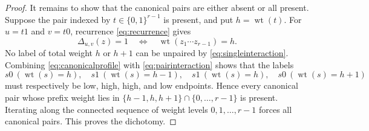 \documentclass[11pt]{article}
\theoremstyle{definition}
\newcommand{\wt}{\operatorname{wt}}
\newcommand{\bits}{\{0,1\}}
\begin{document}
\begin{proof}
It remains to show that the canonical pairs are either absent or all present.  Suppose the pair indexed by $t\in\bits^{r-1}$ is present, and put $h=\wt(t)$.  For $u=t1$ and $v=t0$, recurrence \eqref{eq:recurrence} gives
\begin{equation}\label{eq:canonicalprofile}
 \Delta_{u,v}(z)=1
 \quad\Longleftrightarrow\quad
 \wt(z_1\cdots z_{r-1})=h.
\end{equation}
No label of total weight $h$ or $h+1$ can be unpaired by \eqref{eq:singleinteraction}.  Combining \eqref{eq:canonicalprofile} with \eqref{eq:pairinteraction} shows that the labels
\[
 s0\ (\wt(s)=h),\quad
 s1\ (\wt(s)=h-1),\quad
 s1\ (\wt(s)=h),\quad
 s0\ (\wt(s)=h+1)
\]
must respectively be low, high, high, and low endpoints.  Hence every canonical pair whose prefix weight lies in
 $\{h-1,h,h+1\}\cap\{0,\ldots,r-1\}$ is present.  Iterating along the connected sequence of weight levels $0,1,\ldots,r-1$ forces all canonical pairs.  This proves the dichotomy.
\end{proof}
\end{document}
